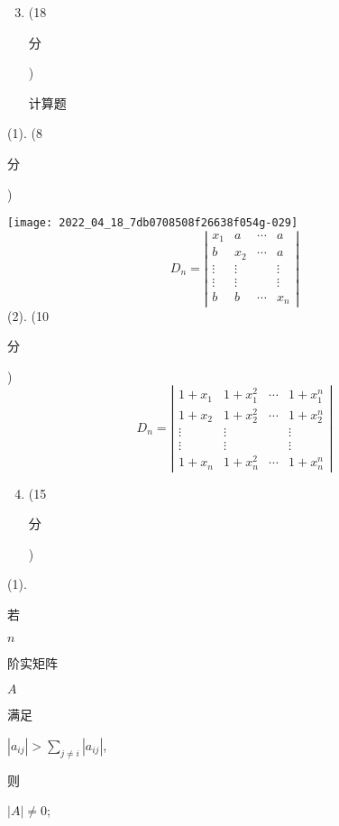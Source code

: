 \documentclass[10pt]{article}
\begin{document}
\begin{enumerate}
  \setcounter{enumi}{2}
  \item (18 \begin{CJK}{UTF8}{mj}分\end{CJK}) \begin{CJK}{UTF8}{mj}计算题\end{CJK}
\end{enumerate}
(1). (8 \begin{CJK}{UTF8}{mj}分\end{CJK})

\texttt{[image: 2022\_04\_18\_7db0708508f26638f054g-029]}
$$
D_{n}=\left|\begin{array}{cccc}
x_{1} & a & \cdots & a \\
b & x_{2} & \cdots & a \\
\vdots & \vdots & & \vdots \\
\vdots & \vdots & & \vdots \\
b & b & \cdots & x_{n}
\end{array}\right|
$$
(2). (10 \begin{CJK}{UTF8}{mj}分\end{CJK})
$$
D_{n}=\left|\begin{array}{cccc}
1+x_{1} & 1+x_{1}^{2} & \cdots & 1+x_{1}^{n} \\
1+x_{2} & 1+x_{2}^{2} & \cdots & 1+x_{2}^{n} \\
\vdots & \vdots & & \vdots \\
\vdots & \vdots & & \vdots \\
1+x_{n} & 1+x_{n}^{2} & \cdots & 1+x_{n}^{n}
\end{array}\right|
$$

\begin{enumerate}
  \setcounter{enumi}{3}
  \item (15 \begin{CJK}{UTF8}{mj}分\end{CJK})
\end{enumerate}
(1). \begin{CJK}{UTF8}{mj}若\end{CJK} $n$ \begin{CJK}{UTF8}{mj}阶实矩阵\end{CJK} $A$ \begin{CJK}{UTF8}{mj}满足\end{CJK} $\left|a_{i j}\right|>\sum_{j \neq i}\left|a_{i j}\right|$, \begin{CJK}{UTF8}{mj}则\end{CJK} $|A| \neq 0$;
\end{document}
